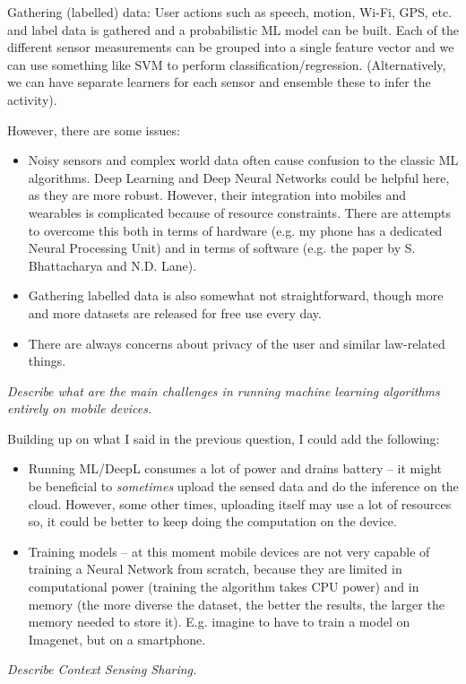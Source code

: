 \documentclass[12pt]{article}
\newcommand*\circled[1]{\tikz[baseline=(char.base)]{
		\node[shape=circle,draw,inner sep=0pt] (char) {#1};}}
\begin{document}
Gathering (labelled) data: User actions such as speech, motion, Wi-Fi, GPS,
etc. and label data is gathered and a probabilistic ML model can be built. Each
of the different sensor measurements can be grouped into a single feature
vector and we can use something like SVM to perform classification/regression.
(Alternatively, we can have separate learners for each sensor and ensemble
these to infer the activity).

However, there are some issues:
\begin{itemize}
    \item Noisy sensors and complex world data often cause confusion to the
        classic ML algorithms. Deep Learning and Deep Neural Networks could be
        helpful here, as they are more robust. However, their integration into
        mobiles and wearables is complicated because of resource constraints.
        There are attempts to overcome this both in terms of hardware (e.g. my
        phone has a dedicated Neural Processing Unit) and in terms of software
        (e.g. the paper by S. Bhattacharya and N.D. Lane).
    \item Gathering labelled data is also somewhat not straightforward, though
        more and more datasets are released for free use every day.
    \item There are always concerns about privacy of the user and similar
        law-related things.
\end{itemize}
\textit{\circled{3.} Describe what are the main challenges in running machine
learning algorithms entirely on mobile devices.}

Building up on what I said in the previous question, I could add the following: \begin{itemize}
    \item Running ML/DeepL consumes a lot of power and drains battery -- it might
        be beneficial to \emph{sometimes} upload the sensed data and do the
        inference on the cloud. However, some other times, uploading itself may
        use a lot of resources so, it could be better to keep doing the
        computation on the device.
    \item Training models -- at this moment mobile devices are not very capable
        of training a Neural Network from scratch, because they are limited in
        computational power (training the algorithm takes CPU power) and in
        memory (the more diverse the dataset, the better the results, the
        larger the memory needed to store it). E.g. imagine to have to train
        a model on Imagenet, but on a smartphone.
\end{itemize}
\textit{\circled{4.} Describe Context Sensing Sharing.}
\end{document}
